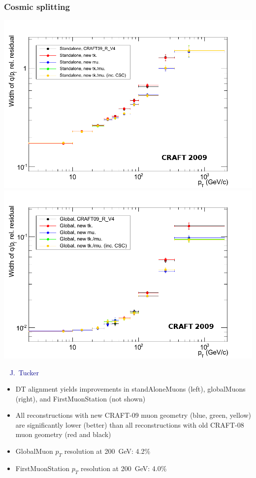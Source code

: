 \documentclass[compress]{beamer}
\begin{document}
\begin{frame}
\frametitle{Cosmic splitting}
\includegraphics[width=0.5\linewidth]{StandAlone.png}
\includegraphics[width=0.5\linewidth]{GlobalMuon.png}

\mbox{ } \hfill {\scriptsize \textcolor{darkblue}{J.~Tucker}}

\vfill
\begin{itemize}
\item DT alignment yields improvements in standAloneMuons (left), globalMuons (right), and FirstMuonStation (not shown)
\item All reconstructions with new CRAFT-09 muon geometry (blue,
  green, yellow) are significantly lower (better) than all
  reconstructions with old CRAFT-08 muon geometry (red and black)
\item GlobalMuon $p_T$ resolution at 200~GeV: 4.2\%
\item FirstMuonStation $p_T$ resolution at 200~GeV: 4.0\%
\end{itemize}
\end{frame}
\end{document}
